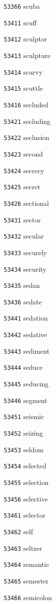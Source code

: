 \documentclass[twoside,11pt]{article}
\begin{document}
\begin{multicols}{5}
\begin{enumerate}
\item[\texttt{53366}] scuba
\item[\texttt{53411}] scuff
\item[\texttt{53412}] sculptor
\item[\texttt{53413}] sculpture
\item[\texttt{53414}] scurvy
\item[\texttt{53415}] scuttle
\item[\texttt{53416}] secluded
\item[\texttt{53421}] secluding
\item[\texttt{53422}] seclusion
\item[\texttt{53423}] second
\item[\texttt{53424}] secrecy
\item[\texttt{53425}] secret
\item[\texttt{53426}] sectional
\item[\texttt{53431}] sector
\item[\texttt{53432}] secular
\item[\texttt{53433}] securely
\item[\texttt{53434}] security
\item[\texttt{53435}] sedan
\item[\texttt{53436}] sedate
\item[\texttt{53441}] sedation
\item[\texttt{53442}] sedative
\item[\texttt{53443}] sediment
\item[\texttt{53444}] seduce
\item[\texttt{53445}] seducing
\item[\texttt{53446}] segment
\item[\texttt{53451}] seismic
\item[\texttt{53452}] seizing
\item[\texttt{53453}] seldom
\item[\texttt{53454}] selected
\item[\texttt{53455}] selection
\item[\texttt{53456}] selective
\item[\texttt{53461}] selector
\item[\texttt{53462}] self
\item[\texttt{53463}] seltzer
\item[\texttt{53464}] semantic
\item[\texttt{53465}] semester
\item[\texttt{53466}] semicolon

\end{enumerate}
\end{multicols}
\end{document}
